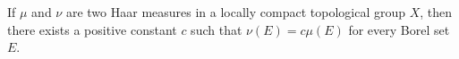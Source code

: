 If $\mu$ and $\nu$ are two Haar measures in a locally compact topological group $X$, then there exists a positive constant $c$ such that $\nu(E) = c\mu(E)$ for every Borel set $E$.
